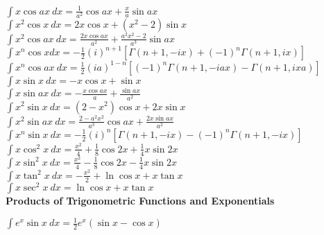 \documentclass[10pt,landscape,a4paper]{article}
\begin{document}
\begin{multicols*}{3}
$
\int x \cos ax \ dx = \frac{1}{a^2} \cos ax + \frac{x}{a} \sin ax 
$\\

$
\int x^2 \cos x \ dx = 2 x \cos x + \left ( x^2 - 2 \right ) \sin x 
$\\

$
\int x^2 \cos ax \ dx = \frac{2 x \cos ax }{a^2} + \frac{ a^2 x^2 - 2  }{a^3} \sin ax 
$\\

$
\int  x^n \cos x dx = 
-\frac{1}{2}(i)^{n+1}\left [ \Gamma(n+1, -ix) 
+ (-1)^n \Gamma(n+1, ix)\right] 
$\\

$
\int x^n \cos ax \ dx =
 \frac{1}{2}(ia)^{1-n}\left [ (-1)^n  \Gamma(n+1, -iax) 
 -\Gamma(n+1, ixa)\right] 
$\\

$
\int x \sin x\ dx = -x \cos x + \sin x 
$\\

$
\int x \sin ax\ dx = -\frac{x \cos ax}{a} + \frac{\sin ax}{a^2} 
$\\

$
\int x^2 \sin x\ dx = \left(2-x^2\right) \cos x + 2 x \sin x
$\\

$
\int x^2 \sin ax\ dx =\frac{2-a^2x^2}{a^3}\cos ax +\frac{ 2 x \sin ax}{a^2} 
$\\

$\label{eq:xul}
\int x^n \sin x \ dx = -\frac{1}{2}(i)^n\left[ \Gamma(n+1, -ix) 
 - (-1)^n\Gamma(n+1, -ix)\right] 
$\\

$
\int x \cos^2 x \ dx = \frac{x^2}{4}+\frac{1}{8}\cos 2x + \frac{1}{4} x \sin 2x
$\\

$
\int x \sin^2 x \ dx = \frac{x^2}{4}-\frac{1}{8}\cos 2x - \frac{1}{4} x \sin 2x
$\\

$
\int x \tan^2 x \ dx = -\frac{x^2}{2} + \ln \cos x + x \tan x
$\\

$
\int x \sec^2 x \ dx = \ln \cos x + x \tan x
$\\
 
\textbf{Products of Trigonometric Functions and Exponentials}

$
\int e^x \sin x \ dx = \frac{1}{2}e^x (\sin x - \cos x) 
$\\


\end{multicols*}
\end{document}
